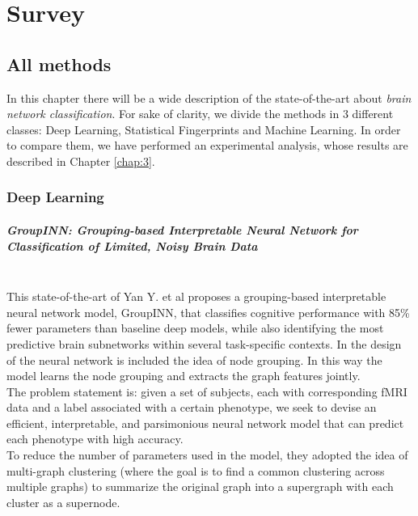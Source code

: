 \chapter{Survey}
\label{chap:2} 

\section{All methods}
In this chapter there will be a wide description of the state-of-the-art about \textit{brain network classification}. For sake of clarity, we divide the methods in 3 different classes: Deep Learning, Statistical Fingerprints and Machine Learning. In order to compare them, we have performed an experimental analysis, whose results are described in Chapter \ref{chap:3}.

\subsection{Deep Learning}
\paragraph{GroupINN: Grouping-based Interpretable Neural Network for Classification of Limited, Noisy Brain Data}\
\\

This state-of-the-art of Yan Y. et al \cite{groupinn} proposes a grouping-based interpretable neural network model, GroupINN, that classifies cognitive performance with 85\% fewer parameters than baseline deep models, while also identifying the most predictive brain subnetworks within several task-specific contexts. In the design of the neural network is included the idea of node grouping. In this way the model learns the node grouping and extracts the graph features jointly.
\\

The problem statement is: given a set of subjects, each with corresponding fMRI data and a label associated with a certain phenotype, we seek to devise an efficient, interpretable, and parsimonious neural network model that can predict each phenotype with high accuracy.
\\

To reduce the number of parameters used in the model, they adopted the idea of multi-graph clustering (where the goal is to find a common clustering across multiple graphs) to summarize the original graph into a supergraph with each cluster as a supernode. 
\\

